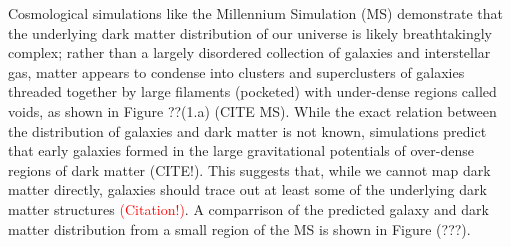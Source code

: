 \documentclass[%
 reprint,
 amsmath,amssymb,
 aps,nofootinbib
]{revtex4-1}
\begin{document}
Cosmological simulations like the Millennium Simulation (MS) demonstrate that the underlying dark matter distribution of our universe is likely breathtakingly complex; rather than a largely disordered collection of galaxies and interstellar gas, matter appears to condense into clusters and superclusters of galaxies threaded together by large filaments (pocketed) with under-dense regions called voids, as shown in Figure ??(1.a) (CITE MS). While the exact relation between the distribution of galaxies and dark matter is not known, simulations predict that early galaxies formed in the large gravitational potentials of over-dense regions of dark matter (CITE!). This suggests that, while we cannot map dark matter directly, galaxies should trace out at least some of the underlying dark matter structures \textcolor{red}{(Citation!)}. A comparrison of the predicted galaxy and dark matter distribution from a small region of the MS is shown in Figure (???).



\end{document}
